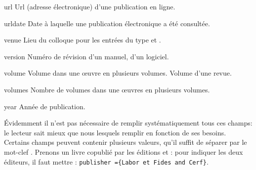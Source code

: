 \begin{choix}
	\item[url] Url (adresse électronique) d'une publication en ligne. 
   	\item[urldate] Date à laquelle une publication électronique a été consultée. 
   	\item[venue] Lieu du colloque pour les entrées du type  et . 
   	\item[version] Numéro de révision d'un manuel, d'un logiciel. 
   	\item[volume] Volume dans une œuvre en plusieurs volumes. Volume d'une revue. 
   	\item[volumes] Nombre de volumes dans une œuvres en plusieurs volumes. 
   	\item[year] Année de publication. 				
\end{choix}


Évidemment il n'est pas nécessaire de remplir  systématiquement tous ces champs: le lecteur sait mieux que nous lesquels remplir en fonction de ses besoins. Certains champs peuvent contenir plusieurs valeurs, qu'il suffit de séparer par le mot-clef . Prenons un livre copublié par les éditions  et  : pour indiquer les deux éditeurs, il faut mettre : \verb|publisher ={Labor et Fides and Cerf}|.



